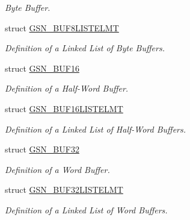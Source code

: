 \begin{DoxyCompactItemize}
\begin{DoxyCompactList}\small\item\em Byte Buffer. \end{DoxyCompactList}\item 
struct \hyperlink{a00034}{GSN\_\-BUF8LISTELMT}
\begin{DoxyCompactList}\small\item\em Definition of a Linked List of Byte Buffers. \end{DoxyCompactList}\item 
struct \hyperlink{a00029}{GSN\_\-BUF16}
\begin{DoxyCompactList}\small\item\em Definition of a Half-\/Word Buffer. \end{DoxyCompactList}\item 
struct \hyperlink{a00030}{GSN\_\-BUF16LISTELMT}
\begin{DoxyCompactList}\small\item\em Definition of a Linked List of Half-\/Word Buffers. \end{DoxyCompactList}\item 
struct \hyperlink{a00031}{GSN\_\-BUF32}
\begin{DoxyCompactList}\small\item\em Definition of a Word Buffer. \end{DoxyCompactList}\item 
struct \hyperlink{a00032}{GSN\_\-BUF32LISTELMT}
\begin{DoxyCompactList}\small\item\em Definition of a Linked List of Word Buffers. \end{DoxyCompactList}\end{DoxyCompactItemize}
